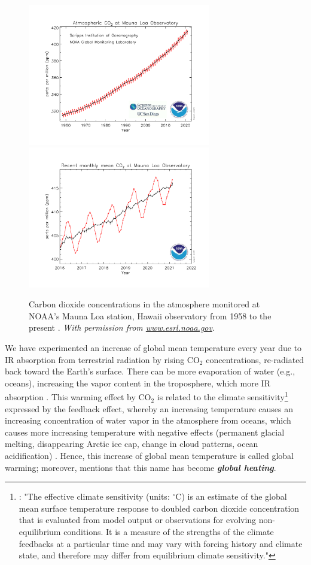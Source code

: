 \begin{figure}[htbp]
    \centering
    \includegraphics[width=8cm]{fig/co2_data_mlo.pdf}
    \includegraphics[width=8cm]{fig/co2_trend_mlo.pdf}
    \caption{Carbon dioxide concentrations in the atmosphere monitored at NOAA's Mauna Loa station, Hawaii observatory from 1958 to the present \citep{Tans2021}. \textit{With permission from \href{https://www.esrl.noaa.gov/gmd/ccgg/trends/mlo.html}{www.esrl.noaa.gov}}.}
    \label{fig:co2_data}
\end{figure}

We have experimented an increase of global mean temperature every year due to IR absorption from terrestrial radiation by rising CO$_2$ concentrations, re-radiated back toward the Earth's surface.
There can be more evaporation of water (e.g., oceans), increasing the vapor content in the troposphere, which more IR absorption \citep{Letcher2021}.
This warming effect by CO$_2$ is related to the climate sensitivity\footnote{\citet[Glossary Annex III]{IPCC2013}: "The effective climate sensitivity (units: $^\circ$C) is an estimate of the global mean surface temperature response to doubled carbon dioxide concentration that is evaluated from model output or observations for evolving non-equilibrium conditions. It is a measure of the strengths of the climate feedbacks at a particular time and may vary with forcing history and climate state, and therefore may differ from equilibrium climate sensitivity."} expressed by the feedback effect, whereby an increasing temperature causes an increasing concentration of water vapor in the atmosphere from oceans, which causes more increasing temperature with negative effects (permanent glacial melting, disappearing Arctic ice cap, change in cloud patterns, ocean acidification) \citep{Farmer2013, Letcher2021}.
Hence, this increase of global mean temperature is called global warming; moreover, \citet{Tuckett2021} mentions that this name has become \textbf{\textit{global heating}}.

